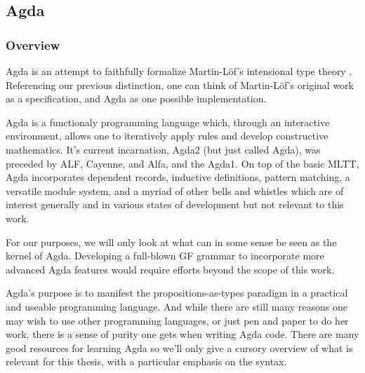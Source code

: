 \subsection{Agda}

\subsubsection{Overview}
Agda is an attempt to faithfully formalize Martin-Löf's intensional type theory
\cite{ml1984}. Referencing our previous distinction, one can think of
Martin-Löf's original work as a specification, and Agda as one possible
implementation.

Agda is a functionaly programming language which, through an interactive
environment, allows one to iteratively apply rules and develop constructive
mathematics. It's current incarnation, Agda2 (but just called Agda), was
preceded by ALF, Cayenne, and Alfa, and the Agda1. On top of the basic MLTT,
Agda incorporates dependent records, inductive definitions, pattern matching, a
versatile module system, and a myriad of other bells and whistles which are of
interest generally and in various states of development but not relevant to this
work.

For our purposes, we will only look at what can in some sense be seen as the
kernel of Agda. Developing a full-blown GF grammar to incorporate more
advanced Agda features would require efforts beyond the scope of this work.

Agda's purpose is to manifest the propositions-as-types paradigm in a practical
and useable programming language. And while there are still many reasons one may
wish to use other programming languages, or just pen and paper to do her work,
there is a sense of purity one gets when writing Agda code. There are many good
resources for learning Agda \cite{Bove2009} \cite{stump} \cite{ulf}
\cite{wadler} so we'll only give a cursory overview of what is relevant for this
thesis, with a particular emphasis on the syntax.





